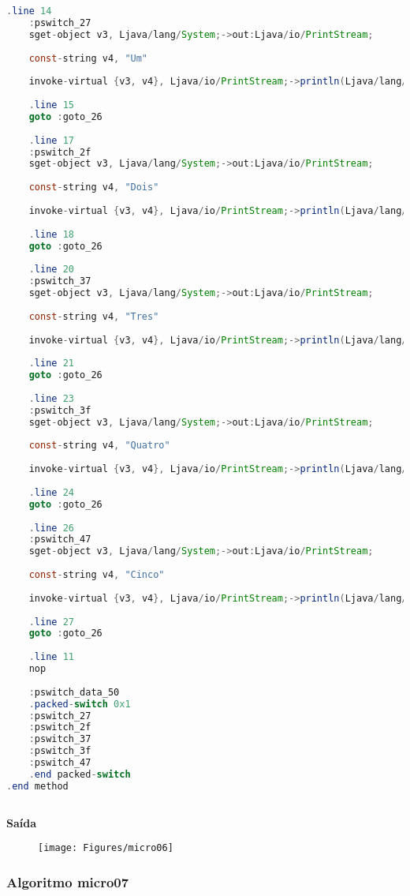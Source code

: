 \documentclass[hidelinks,12pt]{article}
\begin{document}
\begin{lstlisting}[caption=Smali resultante do .java,language=java]
	.line 14
	:pswitch_27
	sget-object v3, Ljava/lang/System;->out:Ljava/io/PrintStream;
	
	const-string v4, "Um"
	
	invoke-virtual {v3, v4}, Ljava/io/PrintStream;->println(Ljava/lang/String;)V
	
	.line 15
	goto :goto_26
	
	.line 17
	:pswitch_2f
	sget-object v3, Ljava/lang/System;->out:Ljava/io/PrintStream;
	
	const-string v4, "Dois"
	
	invoke-virtual {v3, v4}, Ljava/io/PrintStream;->println(Ljava/lang/String;)V
	
	.line 18
	goto :goto_26
	
	.line 20
	:pswitch_37
	sget-object v3, Ljava/lang/System;->out:Ljava/io/PrintStream;
	
	const-string v4, "Tres"
	
	invoke-virtual {v3, v4}, Ljava/io/PrintStream;->println(Ljava/lang/String;)V
	
	.line 21
	goto :goto_26
	
	.line 23
	:pswitch_3f
	sget-object v3, Ljava/lang/System;->out:Ljava/io/PrintStream;
	
	const-string v4, "Quatro"
	
	invoke-virtual {v3, v4}, Ljava/io/PrintStream;->println(Ljava/lang/String;)V
	
	.line 24
	goto :goto_26
	
	.line 26
	:pswitch_47
	sget-object v3, Ljava/lang/System;->out:Ljava/io/PrintStream;
	
	const-string v4, "Cinco"
	
	invoke-virtual {v3, v4}, Ljava/io/PrintStream;->println(Ljava/lang/String;)V
	
	.line 27
	goto :goto_26
	
	.line 11
	nop
	
	:pswitch_data_50
	.packed-switch 0x1
	:pswitch_27
	:pswitch_2f
	:pswitch_37
	:pswitch_3f
	:pswitch_47
	.end packed-switch
.end method	
	
	\end{lstlisting}
	
	{\large{\textbf{Saída}}}
	
	\begin{figure}[!h]
		\centering
		\texttt{[image: Figures/micro06]}
	\end{figure}
	
	\subsubsection{Algoritmo micro07}
	
\end{document}
